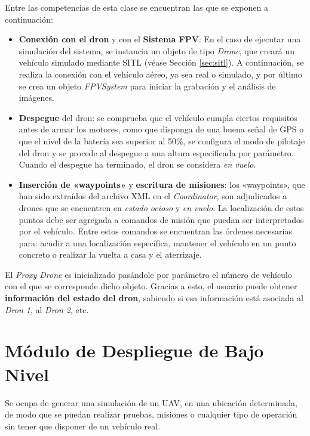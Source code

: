 Entre las competencias de esta clase se encuentran las que se exponen a continuación:

\begin{itemize}
\item \textbf{Conexión con el dron} y con el \textbf{Sistema \acs{FPV}}: En el caso de ejecutar una simulación del sistema, se instancia un objeto de tipo \textit{Drone}, que creará un vehículo simulado mediante \acs{SITL} (véase Sección \ref{sec:sitl}). A continuación, se realiza la conexión con el vehículo aéreo, ya sea real o simulado, y por último se crea un objeto \textit{FPVSystem} para iniciar la grabación y el análisis de imágenes.
\item \textbf{Despegue} del dron: se comprueba que el vehículo cumpla ciertos requisitos antes de armar los motores, como que disponga de una buena señal de \acs{GPS} o que el nivel de la batería sea superior al 50\%, se configura el modo de pilotaje del dron y se procede al despegue a una altura especificada por parámetro. Cuando el despegue ha terminado, el dron se considera \textit{en vuelo}. 
\item \textbf{Inserción de «waypoints»} y \textbf{escritura de misiones}: los «waypoints», que han sido extraídos del archivo XML en el \textit{Coordinator}, son adjudicados a drones que se encuentren en \textit{estado ocioso} y \textit{en vuelo}. La localización de estos puntos debe ser agregada a comandos de misión que puedan ser interpretados por el vehículo. Entre estos comandos se encuentran las órdenes necesarias para: acudir a una localización específica, mantener el vehículo en un punto concreto o realizar la vuelta a casa y el aterrizaje.
\end{itemize}

El \textit{Proxy Drone} es inicializado pasándole por parámetro el número de vehículo con el que se corresponde dicho objeto. Gracias a esto, el usuario puede obtener \textbf{información del estado del dron}, sabiendo si esa información está asociada al \textit{Dron 1}, al \textit{Dron 2}, etc.

\section{Módulo de Despliegue de Bajo Nivel}

Se ocupa de generar una simulación de un \acs{UAV}, en una ubicación determinada, de modo que se puedan realizar pruebas, misiones o cualquier tipo de operación sin tener que disponer de un vehículo real.

